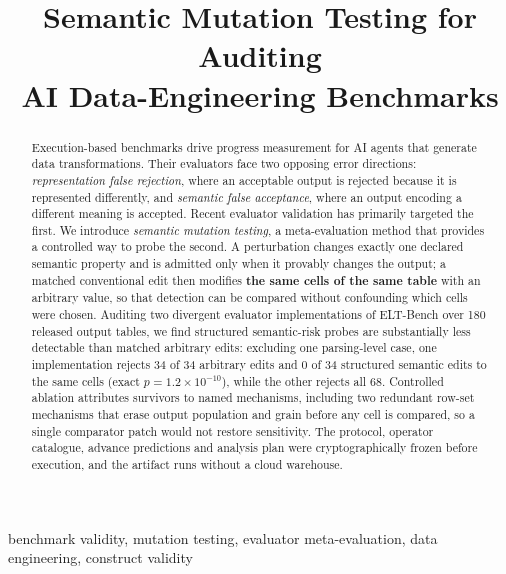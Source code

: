 \documentclass[10pt,conference]{IEEEtran}
\begin{document}
\title{Semantic Mutation Testing for Auditing\\ AI Data-Engineering Benchmarks}

\author{
}

\maketitle

\begin{abstract}
Execution-based benchmarks drive progress measurement for AI agents that generate
data transformations. Their evaluators face two opposing error directions:
\emph{representation false rejection}, where an acceptable output is rejected
because it is represented differently, and \emph{semantic false acceptance}, where
an output encoding a different meaning is accepted. Recent evaluator validation has
primarily targeted the first. We introduce \emph{semantic mutation testing}, a
meta-evaluation method that provides a controlled way to probe the second. A perturbation changes exactly
one declared semantic property and is admitted only when it provably changes the
output; a matched conventional edit then modifies \textbf{the same cells of the
same table} with an arbitrary value, so that detection can be compared without
confounding which cells were chosen. Auditing two divergent evaluator
implementations of ELT-Bench over 180 released output tables, we find structured
semantic-risk probes are substantially less detectable than matched arbitrary
edits: excluding one parsing-level case, one implementation rejects 34 of 34
arbitrary edits and 0 of 34 structured semantic edits to the same cells (exact
$p\!=\!1.2\times10^{-10}$), while the other rejects all 68. Controlled ablation
attributes survivors to named mechanisms, including two redundant row-set
mechanisms that erase output population and grain before any cell is compared, so
a single comparator patch would not restore sensitivity. The protocol, operator
catalogue, advance predictions and analysis plan were cryptographically frozen
before execution, and the artifact runs without a cloud warehouse.
\end{abstract}

\begin{IEEEkeywords}
benchmark validity, mutation testing, evaluator meta-evaluation, data
engineering, construct validity
\end{IEEEkeywords}
\end{document}
